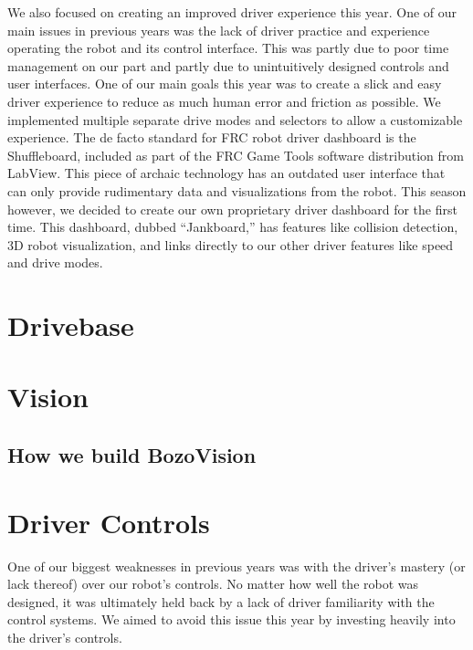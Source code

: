 We also focused on creating an improved driver experience this year. One
of our main issues in previous years was the lack of driver practice and
experience operating the robot and its control interface. This was
partly due to poor time management on our part and partly due to
unintuitively designed controls and user interfaces. One of our main
goals this year was to create a slick and easy driver experience to
reduce as much human error and friction as possible. We implemented
multiple separate drive modes and selectors to allow a customizable
experience. The de facto standard for FRC robot driver dashboard is the
Shuffleboard, included as part of the FRC Game Tools software
distribution from LabView. This piece of archaic technology has an
outdated user interface that can only provide rudimentary data and
visualizations from the robot. This season however, we decided to create
our own proprietary driver dashboard for the first time. This dashboard,
dubbed ``Jankboard,'' has features like collision detection, 3D robot
visualization, and links directly to our other driver features like
speed and drive modes.


\section{Drivebase}


\blindtext{}
\blindtext{}


\section{Vision}


\subsection{How we build BozoVision}


\blindtext{}
\blindtext{}

\section{Driver Controls}

One of our biggest weaknesses in previous years was with the driver's
mastery (or lack thereof) over our robot's controls. No matter how well
the robot was designed, it was ultimately held back by a lack of driver
familiarity with the control systems. We aimed to avoid this issue this
year by investing heavily into the driver's controls.

